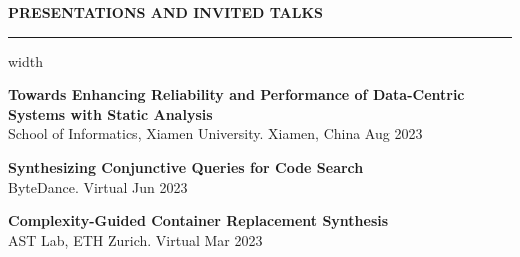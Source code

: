 \documentclass[centered]{resume}
\newlength{\cvsectiongap}
\newenvironment{rSection}[1]{%
  \par\Needspace{5\baselineskip}\addvspace{\cvsectiongap}
  {\bfseries \MakeUppercase{#1}}\vspace{0.65em}%
  \noindent\hrule width \linewidth\vspace{-0.45em}\par
}{\par}
\begin{document}
\begin{resume}
\begin{rSection}{Presentations and Invited Talks}
\textbf{Towards Enhancing Reliability and Performance of Data-Centric Systems with Static Analysis}\\
School of Informatics, Xiamen University. Xiamen, China \hfill Aug 2023

\textbf{Synthesizing Conjunctive Queries for Code Search}\\
ByteDance. Virtual \hfill Jun 2023

\textbf{Complexity-Guided Container Replacement Synthesis}\\
AST Lab, ETH Zurich. Virtual \hfill Mar 2023










\end{rSection}




\end{resume}
\end{document}
